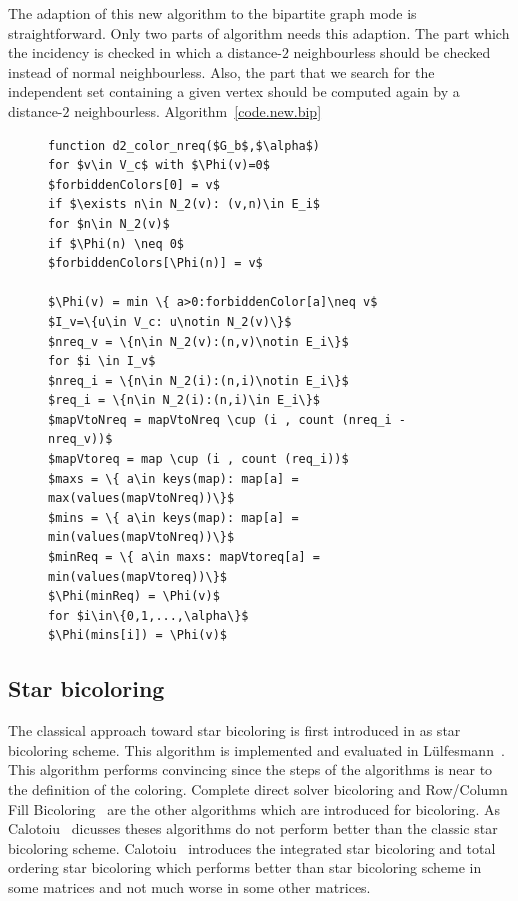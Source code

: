 \documentclass[12pt, twoside]{book}
\newcommand{\coderef}[1]{Algorithm~\protect\ref{#1}}
\begin{document}
The adaption of this new algorithm to the bipartite graph mode is straightforward.
Only two parts of algorithm needs this adaption. The part which the incidency is checked
in which a distance-$2$ neighbourless should be checked instead of normal neighbourless.
Also, the part that we search for the independent set containing a given vertex should
be computed again by a distance-$2$ neighbourless.
\coderef{code.new.bip}
\begin{figure}
\begin{lstlisting}[caption=New coloring heuristc rewritten in the bipartite graph model,label=code.new.bip,mathescape]
function d2_color_nreq($G_b$,$\alpha$)
for $v\in V_c$ with $\Phi(v)=0$
$forbiddenColors[0] = v$
if $\exists n\in N_2(v): (v,n)\in E_i$
for $n\in N_2(v)$
if $\Phi(n) \neq 0$
$forbiddenColors[\Phi(n)] = v$

$\Phi(v) = min \{ a>0:forbiddenColor[a]\neq v$
$I_v=\{u\in V_c: u\notin N_2(v)\}$
$nreq_v = \{n\in N_2(v):(n,v)\notin E_i\}$
for $i \in I_v$
$nreq_i = \{n\in N_2(i):(n,i)\notin E_i\}$
$req_i = \{n\in N_2(i):(n,i)\in E_i\}$
$mapVtoNreq = mapVtoNreq \cup (i , count (nreq_i - nreq_v))$
$mapVtoreq = map \cup (i , count (req_i))$
$maxs = \{ a\in keys(map): map[a] = max(values(mapVtoNreq))\}$
$mins = \{ a\in keys(map): map[a] = min(values(mapVtoNreq))\}$
$minReq = \{ a\in maxs: mapVtoreq[a] = min(values(mapVtoreq))\}$
$\Phi(minReq) = \Phi(v)$
for $i\in\{0,1,...,\alpha\}$
$\Phi(mins[i]) = \Phi(v)$
\end{lstlisting}
\end{figure}

\subsection{Star bicoloring}
\label{s.heuristic.starbicoloring}
The classical approach toward star bicoloring is first introduced in
\cite{Gebremedhin05whatcolor} as star bicoloring scheme.
This algorithm is implemented and evaluated in
Lülfesmann~\cite{LulfesmannMaster}. This algorithm performs convincing
since the steps of the algorithms is near to the definition of the coloring.
Complete direct solver bicoloring and Row/Column Fill Bicoloring~\cite{Hossain95computinga}
are the other algorithms which are introduced for bicoloring.
As Calotoiu~\cite{CalotoiuMaster} dicusses theses algorithms do not perform
better than the classic star bicoloring scheme.
Calotoiu~\cite{CalotoiuMaster} introduces the integrated star bicoloring
and total ordering star bicoloring which performs better than
star bicoloring scheme in some matrices and not much worse in some other
matrices.
\end{document}
